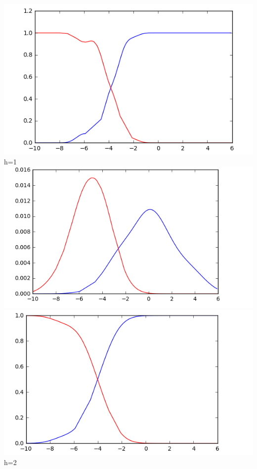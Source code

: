 \documentclass[11]{article}
\begin{document}
\includegraphics[scale=0.75]{1-a-4.png} \\
h=1 \\
\includegraphics[scale=0.75]{1-a-6.png} \\
\includegraphics[scale=0.75]{1-a-7.png} \\
h=2 \\
\end{document}
